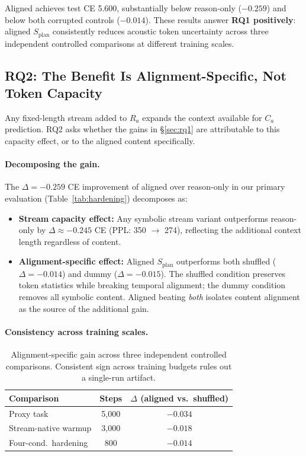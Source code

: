\documentclass[11pt]{article}
\newcommand{\splan}{$S_{\mathrm{plan}}$}
\newcommand{\Ramath}{R_a}
\newcommand{\Camath}{C_a}
\begin{document}
Aligned achieves test CE 5.600, substantially below reason-only ($-0.259$) and below
both corrupted controls ($-0.014$).  These results answer \textbf{RQ1 positively}:
aligned \splan{} consistently reduces acoustic token uncertainty across three
independent controlled comparisons at different training scales.

\subsection{RQ2: The Benefit Is Alignment-Specific, Not Token Capacity}
\label{sec:rq2}

Any fixed-length stream added to $\Ramath$ expands the context available for $\Camath$
prediction.  RQ2 asks whether the gains in \S\ref{sec:rq1} are attributable to this
capacity effect, or to the aligned content specifically.

\paragraph{Decomposing the gain.}
The $\Delta = -0.259$ CE improvement of aligned over reason-only in our primary
evaluation (Table~\ref{tab:hardening}) decomposes as:

\begin{itemize}
  \item \textbf{Stream capacity effect:} Any symbolic stream variant outperforms
    reason-only by $\Delta \approx -0.245$ CE (PPL: 350 $\to$ 274), reflecting
    the additional context length regardless of content.
  \item \textbf{Alignment-specific effect:} Aligned \splan{} outperforms both
    shuffled ($\Delta = -0.014$) and dummy ($\Delta = -0.015$).  The shuffled
    condition preserves token statistics while breaking temporal alignment; the
    dummy condition removes all symbolic content.  Aligned beating \emph{both}
    isolates content alignment as the source of the additional gain.
\end{itemize}

\paragraph{Consistency across training scales.}

\begin{table}[h]
\centering
\small
\begin{tabular}{lcc}
\toprule
Comparison & Steps & $\Delta$ (aligned vs.\ shuffled) \\
\midrule
Proxy task           & 5,000 & $-0.034$ \\
Stream-native warmup & 3,000 & $-0.018$ \\
Four-cond.\ hardening & 800  & $-0.014$ \\
\bottomrule
\end{tabular}
\caption{Alignment-specific gain across three independent controlled comparisons.
  Consistent sign across training budgets rules out a single-run artifact.}
\label{tab:rq2_summary}
\end{table}
\end{document}

